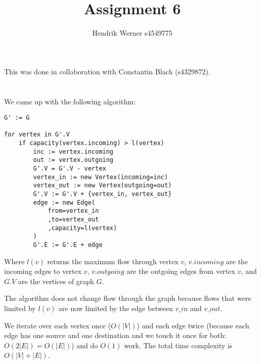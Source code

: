 \documentclass[12pt]{article}
\title {Assignment 6}
\author {Hendrik Werner s4549775}
\begin{document}
\maketitle

This was done in collaboration with Constantin Blach (s4329872).

\section{} %
\section{} %
We came up with the following algorithm:

\begin{lstlisting}
G' := G

for vertex in G'.V
	if capacity(vertex.incoming) > l(vertex)
		inc := vertex.incoming
		out := vertex.outgoing
		G'.V = G'.V - vertex
		vertex_in := new Vertex(incoming=inc)
		vertex_out := new Vertex(outgoing=out)
		G'.V := G'.V + {vertex_in, vertex_out}
		edge := new Edge(
			from=vertex_in
			,to=vertex_out
			,capacity=l(vertex)
		)
		G'.E := G'.E + edge
\end{lstlisting}

Where $l(v)$ returns the maximum flow through vertex $v$, $v.incoming$ are the incoming edges to vertex $v$, $v.outgoing$ are the outgoing edges from vertex $v$, and $G.V$ are the vertices of graph $G$.

The algorithm does not change flow through the graph because flows that were limited by $l(v)$ are now limited by the edge between $v\_in$ and $v\_out$.

We iterate over each vertex once ($O(|V|)$) and each edge twice (because each edge has one source and one destination and we touch it once for both: $O(2|E|) = O(|E|)$) and do $O(1)$ work. The total time complexity is $O(|V| + |E|)$.

\section{} %
\section{} %
\section{} %
\end{document}
